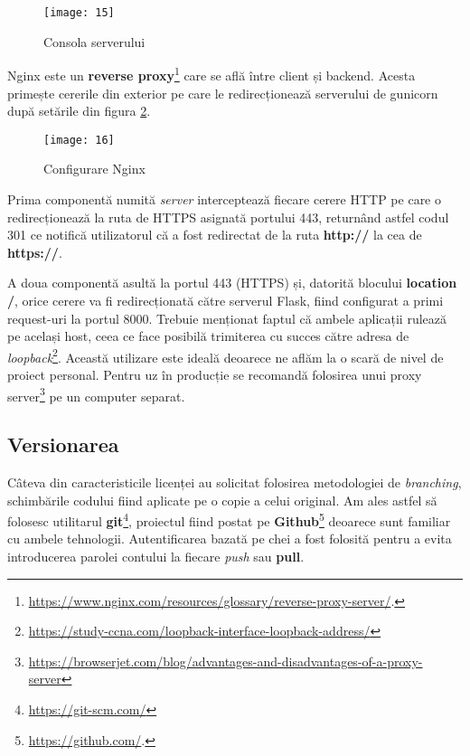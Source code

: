 \begin{figure}[h]
	\centering
	\texttt{[image: 15]}
	\caption{Consola serverului}
	\label{fig:15}
\end{figure}

Nginx este un \textbf{reverse proxy}\footnote{\url{https://www.nginx.com/resources/glossary/reverse-proxy-server/}.} care se află între client și backend. Acesta primește cererile din exterior pe care le redirecționează serverului de gunicorn după setările din figura \ref{fig:16}.

\begin{figure}[h]
	\centering
	\texttt{[image: 16]}
	\caption{Configurare Nginx}
	\label{fig:16}
\end{figure}

Prima componentă numită \emph{server} interceptează fiecare cerere HTTP pe care o redirecționează la ruta de HTTPS asignată portului 443, returnând astfel codul 301 ce notifică utilizatorul că a fost redirectat de la ruta \textbf{http://} la cea de \textbf{https://}.

A doua componentă asultă la portul 443 (HTTPS) și, datorită blocului \textbf{location /}, orice cerere va fi redirecționată către serverul Flask, fiind configurat a primi request-uri la portul 8000. Trebuie menționat faptul că ambele aplicații rulează pe același host, ceea ce face posibilă trimiterea cu succes către adresa de \emph{loopback}\footnote{\url{https://study-ccna.com/loopback-interface-loopback-address/}}. Această utilizare este ideală deoarece ne aflăm la o scară de nivel de proiect personal. Pentru uz în producție se recomandă folosirea unui proxy server\footnote{\url{https://browserjet.com/blog/advantages-and-disadvantages-of-a-proxy-server}} pe un computer separat.

\subsection{Versionarea}

Câteva din caracteristicile licenței au solicitat folosirea metodologiei de \emph{branching}, schimbările codului fiind aplicate pe o copie a celui original. Am ales astfel să folosesc utilitarul \textbf{git}\footnote{\url{https://git-scm.com/}}, proiectul fiind postat pe \textbf{Github}\footnote{\url{https://github.com/}.} deoarece sunt familiar cu ambele tehnologii. Autentificarea bazată pe chei a fost folosită pentru a evita introducerea parolei contului la fiecare \emph{push} sau \textbf{pull}.